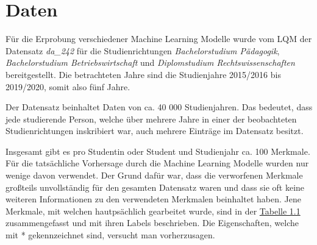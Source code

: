 

\section{Daten}
\label{sec:daten}

F\"ur die Erprobung verschiedener Machine Learning Modelle wurde vom LQM der Datensatz
\textit{da\_242} f\"ur die Studienrichtungen \textit{Bachelorstudium P\"adagogik},
\textit{Bachelorstudium Betriebswirtschaft} und \textit{Diplomstudium Rechtswissenschaften} bereitgestellt.
Die betrachteten Jahre sind die Studienjahre 2015/2016 bis 2019/2020, somit also f\"unf Jahre.

Der Datensatz beinhaltet Daten von ca. 40 000 Studienjahren. Das bedeutet, dass jede studierende Person,
welche \"uber mehrere Jahre in einer der beobachteten Studienrichtungen inskribiert war, auch mehrere Eintr\"age im Datensatz besitzt.

Insgesamt gibt es pro Studentin oder Student und Studienjahr ca. 100 Merkmale.
F\"ur die tats\"achliche Vorhersage durch die Machine Learning Modelle wurden nur wenige davon verwendet.
Der Grund daf\"ur war, dass die verworfenen Merkmale gro{\ss}teils unvollst\"andig f\"ur den gesamten Datensatz waren
und dass sie oft keine weiteren Informationen zu den verwendeten Merkmalen beinhaltet haben. Jene Merkmale, mit welchen hautps\"achlich
gearbeitet wurde, sind in der \hyperref[tab:name]{Tabelle 1.1} zusammengefasst und mit ihren Labels beschrieben. Die Eigenschaften, welche mit
*  gekennzeichnet sind, versucht man vorherzusagen.

